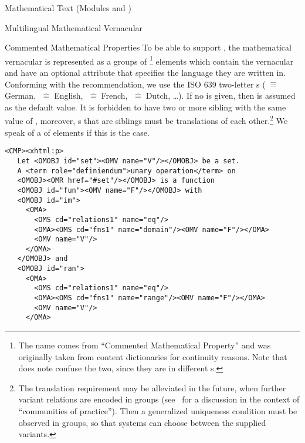 \begin{tchapter}[id=mtxt,short=Mathematical Text]{Mathematical Text (Modules
   and )}
\begin{tsection}[id=mtext]{Multilingual Mathematical Vernacular}
\begin{tsubsection}{Commented Mathematical Properties}
  To be able to support
  ,
  the mathematical vernacular is represented as a groups of \footnote{The
    name comes from ``Commented Mathematical Property'' and was originally taken from
    {\openmath} content dictionaries for continuity
    reasons. Note that {\xml} does note confuse the two, since they are in different
    s.}  elements which contain the vernacular and have an optional
   attribute that specifies the language they are
  written in. Conforming with the {\xml} recommendation, we use the ISO
  639 two-letter s
  ($\;\widehat=\;$German, $\;\widehat=\;$English,
  $\;\widehat=\;$French, $\;\widehat=\;$Dutch, \ldots). If
  no  is given, then  is
  assumed as the default value. It is forbidden to have two or more sibling
   with the same value of , moreover,
  s that are siblings must be translations of each other.\footnote{The
    translation requirement may be alleviated in the future, when further variant
    relations are encoded in  groups (see~\cite{KohKoh:copmem06} for a
    discussion in the context of ``communities of practice''). Then a generalized
    uniqueness condition must be observed in  groups, so that systems can
    choose between the supplied variants.} We speak of a 
  of  elements if this is the case.
\begin{lstlisting}[escapechar=\%,label=lst:multiling,mathescape,
  caption={A Multilingual Group of \element{CMP} Elements},
  index={trl,xml:lang,CMP,FMP,OMOBJ}]
 <CMP><xhtml:p>
   Let <OMOBJ id="set"><OMV name="V"/></OMOBJ> be a set. 
   A <term role="definiendum">unary operation</term> on 
   <OMOBJ><OMR href="#set"/></OMOBJ> is a function  
   <OMOBJ id="fun"><OMV name="F"/></OMOBJ> with
   <OMOBJ id="im">
     <OMA>
       <OMS cd="relations1" name="eq"/>
       <OMA><OMS cd="fns1" name="domain"/><OMV name="F"/></OMA>
       <OMV name="V"/>
     </OMA>
   </OMOBJ> and 
   <OMOBJ id="ran">
     <OMA>
       <OMS cd="relations1" name="eq"/>
       <OMA><OMS cd="fns1" name="range"/><OMV name="F"/></OMA>
       <OMV name="V"/>
     </OMA>

\end{lstlisting}
\end{tsubsection}
\end{tsection}
\end{tchapter}
